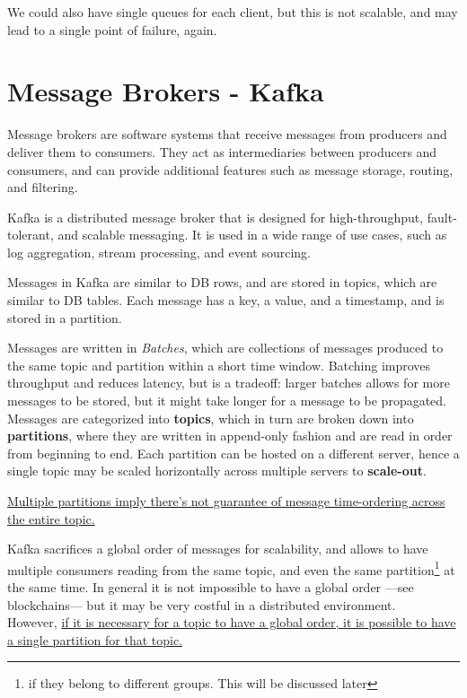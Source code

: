 We could also have single queues for each client, but this is not scalable, and may lead to a single point of failure, again.

\section{Message Brokers - Kafka}
Message brokers are software systems that receive messages from producers and deliver them to consumers. They act as intermediaries between producers and consumers, and can provide additional features such as message storage, routing, and filtering.

Kafka is a distributed message broker that is designed for high-throughput, fault-tolerant, and scalable messaging. It is used in a wide range of use cases, such as log aggregation, stream processing, and event sourcing.

Messages in Kafka are similar to DB rows, and are stored in topics, which are similar to DB tables. Each message has a key, a value, and a timestamp, and is stored in a partition.

Messages are written in \textit{Batches}, which are collections of messages produced to the same topic and partition within a short time window. Batching improves throughput and reduces latency, but is a tradeoff: larger batches allows for more messages to be stored, but it might take longer for a message to be propagated.
\\


Messages are categorized into \textbf{topics}, which in turn are broken down into \textbf{partitions}, where they are written in append-only fashion and are read in order from beginning to end.
Each partition can be hosted on a different server, hence a single topic may be scaled horizontally across multiple servers to \textbf{scale-out}.


\ul{Multiple partitions imply there's not guarantee of message time-ordering across the entire topic.}

Kafka sacrifices a global order of messages for scalability, and allows to have multiple consumers reading from the same topic, and even the same partition\footnote{if they belong to different groups. This will be discussed later} at the same time.
In general it is not impossible to have a global order ---see blockchains--- but it may be very costful in a distributed environment.\\
However, \ul{if it is necessary for a topic to have a global order, it is possible to have a single partition for that topic.}

